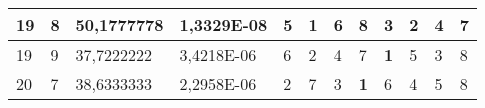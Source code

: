 \documentclass[conference]{IEEEtran}
\begin{document}
\begin{table*}[]
\begin{tabular}{|llll|llllllll|}
\multicolumn{1}{|l|}{19}                                                    & \multicolumn{1}{l|}{8}                                                        & \multicolumn{1}{l|}{50,1777778}                                                   & 1,3329E-08                     & \multicolumn{1}{l|}{5}                                                  & \multicolumn{1}{l|}{\textbf{1}}                                         & \multicolumn{1}{l|}{6}                                                  & \multicolumn{1}{l|}{8}                                                  & \multicolumn{1}{l|}{3}                                                  & \multicolumn{1}{l|}{2}                                                  & \multicolumn{1}{l|}{4}                                                  & 7                          \\ \hline
\multicolumn{1}{|l|}{19}                                                    & \multicolumn{1}{l|}{9}                                                        & \multicolumn{1}{l|}{37,7222222}                                                   & 3,4218E-06                     & \multicolumn{1}{l|}{6}                                                  & \multicolumn{1}{l|}{2}                                                  & \multicolumn{1}{l|}{4}                                                  & \multicolumn{1}{l|}{7}                                                  & \multicolumn{1}{l|}{\textbf{1}}                                         & \multicolumn{1}{l|}{5}                                                  & \multicolumn{1}{l|}{3}                                                  & 8                          \\ \hline
\multicolumn{1}{|l|}{20}                                                    & \multicolumn{1}{l|}{7}                                                        & \multicolumn{1}{l|}{38,6333333}                                                   & 2,2958E-06                     & \multicolumn{1}{l|}{2}                                                  & \multicolumn{1}{l|}{7}                                                  & \multicolumn{1}{l|}{3}                                                  & \multicolumn{1}{l|}{\textbf{1}}                                         & \multicolumn{1}{l|}{6}                                                  & \multicolumn{1}{l|}{4}                                                  & \multicolumn{1}{l|}{5}                                                  & 8                          \\ \hline

\end{tabular}
\end{table*}
\end{document}
